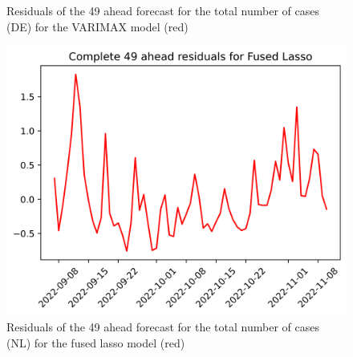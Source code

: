 \begin{figure}
\begin{minipage}{.32\textwidth}
  \caption{Residuals of the 49 ahead forecast for the total number of cases (DE) for the VARIMAX model (red)}
  \label{fig:tot_cases_error_49_VARIMAX_DE}
\end{minipage}
\begin{minipage}{.32\textwidth}
  \centering
  \includegraphics[width=\linewidth]{pics/49_ah/49_ahead_errors_Fused Lasso.png}
  \caption{Residuals of the 49 ahead forecast for the total number of cases (NL) for the fused lasso model (red)}
  \label{fig:tot_cases_error_49_flasso}
\end{minipage}

\end{figure}
